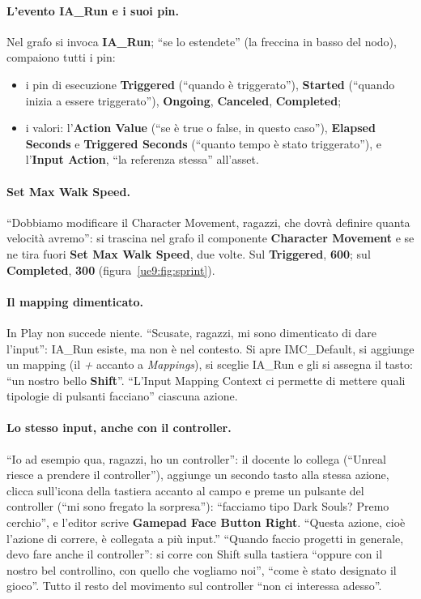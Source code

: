 \paragraph{L'evento IA\_Run e i suoi pin.} Nel grafo si invoca \textbf{IA\_Run}; ``se lo
estendete'' (la freccina in basso del nodo), compaiono tutti i pin:
\begin{itemize}
  \item i pin di esecuzione \textbf{Triggered} (``quando è triggerato''), \textbf{Started}
        (``quando inizia a essere triggerato''), \textbf{Ongoing}, \textbf{Canceled},
        \textbf{Completed};
  \item i valori: l'\textbf{Action Value} (``se è true o false, in questo caso''),
        \textbf{Elapsed Seconds} e \textbf{Triggered Seconds} (``quanto tempo è stato
        triggerato''), e l'\textbf{Input Action}, ``la referenza stessa'' all'asset.
\end{itemize}

\paragraph{Set Max Walk Speed.} ``Dobbiamo modificare il Character Movement, ragazzi, che
dovrà definire quanta velocità avremo'': si trascina nel grafo il componente
\textbf{Character Movement} e se ne tira fuori \textbf{Set Max Walk Speed}, due volte.
Sul \textbf{Triggered}, \textbf{600}; sul \textbf{Completed}, \textbf{300}
(figura~\ref{ue9:fig:sprint}).

\paragraph{Il mapping dimenticato.} In Play non succede niente. ``Scusate, ragazzi, mi
sono dimenticato di dare l'input'': IA\_Run esiste, ma non è nel contesto. Si apre
IMC\_Default, si aggiunge un mapping (il \emph{+} accanto a \emph{Mappings}), si sceglie
IA\_Run e gli si assegna il tasto: ``un nostro bello \textbf{Shift}''. ``L'Input Mapping
Context ci permette di mettere quali tipologie di pulsanti facciano'' ciascuna azione.

\paragraph{Lo stesso input, anche con il controller.} ``Io ad esempio qua, ragazzi, ho un
controller'': il docente lo collega (``Unreal riesce a prendere il controller''), aggiunge
un secondo tasto alla stessa azione, clicca sull'icona della tastiera accanto al campo e
preme un pulsante del controller (``mi sono fregato la sorpresa''): ``facciamo tipo Dark
Souls? Premo cerchio'', e l'editor scrive \textbf{Gamepad Face Button Right}. ``Questa
azione, cioè l'azione di correre, è collegata a più input.'' ``Quando faccio progetti in
generale, devo fare anche il controller'': si corre con Shift sulla tastiera ``oppure con
il nostro bel controllino, con quello che vogliamo noi'', ``come è stato designato il
gioco''. Tutto il resto del movimento sul controller ``non ci interessa adesso''.

